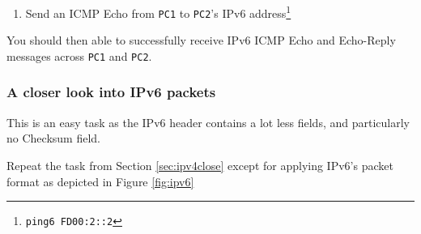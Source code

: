 \documentclass[pdftex,12pt,a4paper]{article}
\begin{document}
\begin{enumerate}
\begin{itemize}
                            \item \texttt{PC1}'s routing
                                table\footnote{\texttt{enable}, \texttt{route -A
                                inet6 -n}}.
                            \item \texttt{PC2}'s routing table.
                        \end{itemize}
                    \item Send an ICMP Echo from \texttt{PC1} to \texttt{PC2}'s
                        IPv6 address\footnote{\texttt{ping6 FD00:2::2}}
                \end{enumerate}

                You should then able to successfully receive IPv6 ICMP Echo and
                Echo-Reply messages across \texttt{PC1} and \texttt{PC2}.

            \subsubsection{A closer look into IPv6 packets}
                This is an easy task as the IPv6 header contains a lot less
                fields, and particularly no Checksum field.

                Repeat the task from Section \ref{sec:ipv4close} except for
                applying IPv6's packet format as depicted in Figure
                \ref{fig:ipv6}
\end{document}
